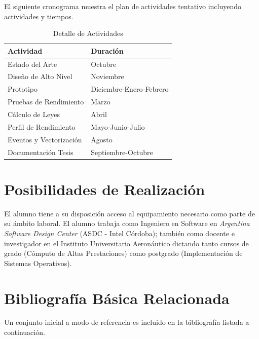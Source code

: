 \documentclass[a4paper]{article}
\begin{document}
El siguiente cronograma muestra el plan de actividades tentativo incluyendo actividades y tiempos.

\begin{table}[H]
  \caption{Detalle de Actividades}
  \centering
    \begin{tabular}{|l|l|}\hline
      {\bf Actividad} & {\bf Duración} \\ \hline
	Estado del Arte & Octubre \\ \hline
      Diseño de Alto Nivel & Noviembre \\ \hline
      Prototipo & Diciembre-Enero-Febrero \\ \hline
      Pruebas de Rendimiento & Marzo \\ \hline
      Cálculo de Leyes & Abril \\ \hline
      Perfil de Rendimiento & Mayo-Junio-Julio \\ \hline
      Eventos y Vectorización & Agosto \\ \hline
      Documentación Tesis & Septiembre-Octubre \\ \hline
    \end{tabular}
  \label{schedule}
\end{table}

\section{Posibilidades de Realización}

El alumno tiene a su disposición acceso al equipamiento necesario como parte de su ámbito laboral.
El alumno trabaja como Ingeniero en Software en {\it Argentina Software Design Center} (ASDC - Intel Córdoba); también
como docente e investigador en el Instituto Universitario Aeronáutico dictando tanto cursos de grado (Cómputo de Altas Prestaciones) como postgrado (Implementación de Sistemas Operativos).

\section{Bibliografía Básica Relacionada}

Un conjunto inicial a modo de referencia es incluido en la bibliografía listada a continuación.
\end{document}
